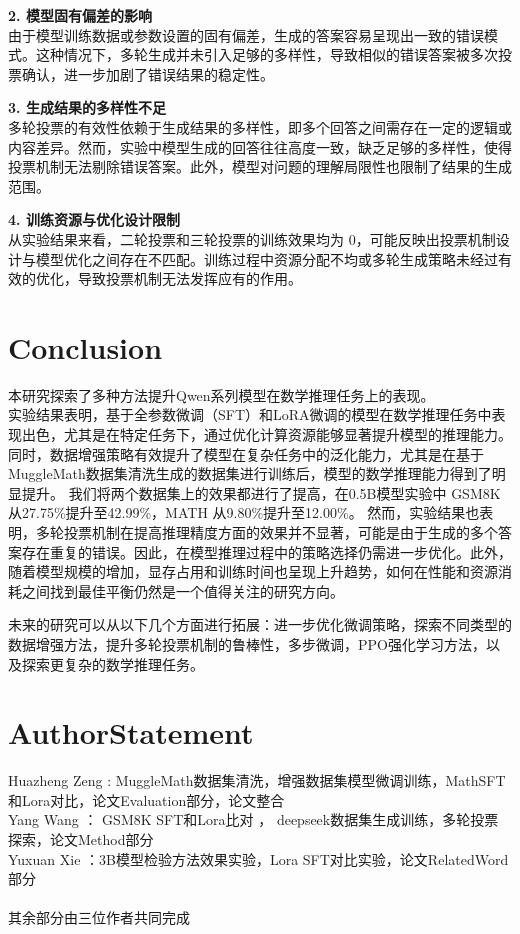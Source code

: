 \documentclass{article}
\begin{document}
\textbf{2. 模型固有偏差的影响}\\
由于模型训练数据或参数设置的固有偏差，生成的答案容易呈现出一致的错误模式。这种情况下，多轮生成并未引入足够的多样性，导致相似的错误答案被多次投票确认，进一步加剧了错误结果的稳定性。

\textbf{3. 生成结果的多样性不足}\\
多轮投票的有效性依赖于生成结果的多样性，即多个回答之间需存在一定的逻辑或内容差异。然而，实验中模型生成的回答往往高度一致，缺乏足够的多样性，使得投票机制无法剔除错误答案。此外，模型对问题的理解局限性也限制了结果的生成范围。

\textbf{4. 训练资源与优化设计限制}\\
从实验结果来看，二轮投票和三轮投票的训练效果均为 $0$，可能反映出投票机制设计与模型优化之间存在不匹配。训练过程中资源分配不均或多轮生成策略未经过有效的优化，导致投票机制无法发挥应有的作用。






  






\section{Conclusion}

本研究探索了多种方法提升Qwen系列模型在数学推理任务上的表现。\\
实验结果表明，基于全参数微调（SFT）和LoRA微调的模型在数学推理任务中表现出色，尤其是在特定任务下，通过优化计算资源能够显著提升模型的推理能力。同时，数据增强策略有效提升了模型在复杂任务中的泛化能力，尤其是在基于MuggleMath数据集清洗生成的数据集进行训练后，模型的数学推理能力得到了明显提升。
我们将两个数据集上的效果都进行了提高，在0.5B模型实验中 GSM8K 从27.75\%提升至42.99\%，MATH 从9.80\%提升至12.00\%。
然而，实验结果也表明，多轮投票机制在提高推理精度方面的效果并不显著，可能是由于生成的多个答案存在重复的错误。因此，在模型推理过程中的策略选择仍需进一步优化。此外，随着模型规模的增加，显存占用和训练时间也呈现上升趋势，如何在性能和资源消耗之间找到最佳平衡仍然是一个值得关注的研究方向。

未来的研究可以从以下几个方面进行拓展：进一步优化微调策略，探索不同类型的数据增强方法，提升多轮投票机制的鲁棒性，多步微调，PPO强化学习方法，以及探索更复杂的数学推理任务。
\section{AuthorStatement}

Huazheng Zeng : MuggleMath数据集清洗，增强数据集模型微调训练，MathSFT和Lora对比，论文Evaluation部分，论文整合\\
Yang Wang ： GSM8K SFT和Lora比对 ， deepseek数据集生成训练，多轮投票探索，论文Method部分\\
Yuxuan Xie ：3B模型检验方法效果实验，Lora SFT对比实验，论文RelatedWord部分\\
\\其余部分由三位作者共同完成






\end{document}
